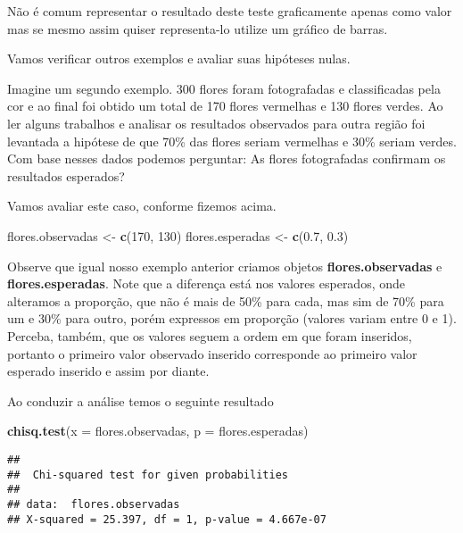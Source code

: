 \documentclass[14pt,titlepage, oneside, openany, a4paper]{book}
\newenvironment{Shaded}{\begin{snugshade}}{\end{snugshade}}
\newcommand{\DataTypeTok}[1]{\textcolor[rgb]{0.13,0.29,0.53}{#1}}
\newcommand{\DecValTok}[1]{\textcolor[rgb]{0.00,0.00,0.81}{#1}}
\newcommand{\FloatTok}[1]{\textcolor[rgb]{0.00,0.00,0.81}{#1}}
\newcommand{\KeywordTok}[1]{\textcolor[rgb]{0.13,0.29,0.53}{\textbf{#1}}}
\newcommand{\NormalTok}[1]{#1}
\newcommand{\StringTok}[1]{\textcolor[rgb]{0.31,0.60,0.02}{#1}}
\begin{document}
Não é comum representar o resultado deste teste graficamente apenas como valor mas se mesmo assim quiser representa-lo utilize um gráfico de barras.

Vamos verificar outros exemplos e avaliar suas hipóteses nulas.

Imagine um segundo exemplo. 300 flores foram fotografadas e classificadas pela cor e ao final foi obtido um total de 170 flores vermelhas e 130 flores verdes. Ao ler alguns trabalhos e analisar os resultados observados para outra região foi levantada a hipótese de que 70\% das flores seriam vermelhas e 30\% seriam verdes. Com base nesses dados podemos perguntar: As flores fotografadas confirmam os resultados esperados?

Vamos avaliar este caso, conforme fizemos acima.

\begin{Shaded}
\begin{Highlighting}[]
\NormalTok{flores.observadas <-}\StringTok{ }\KeywordTok{c}\NormalTok{(}\DecValTok{170}\NormalTok{, }\DecValTok{130}\NormalTok{)}
\NormalTok{flores.esperadas <-}\StringTok{ }\KeywordTok{c}\NormalTok{(}\FloatTok{0.7}\NormalTok{, }\FloatTok{0.3}\NormalTok{)}
\end{Highlighting}
\end{Shaded}

Observe que igual nosso exemplo anterior criamos objetos \textbf{flores.observadas} e \textbf{flores.esperadas}. Note que a diferença está nos valores esperados, onde alteramos a proporção, que não é mais de 50\% para cada, mas sim de 70\% para um e 30\% para outro, porém expressos em proporção (valores variam entre 0 e 1). Perceba, também, que os valores seguem a ordem em que foram inseridos, portanto o primeiro valor observado inserido corresponde ao primeiro valor esperado inserido e assim por diante.

Ao conduzir a análise temos o seguinte resultado

\begin{Shaded}
\begin{Highlighting}[]
\KeywordTok{chisq.test}\NormalTok{(}\DataTypeTok{x =}\NormalTok{ flores.observadas, }\DataTypeTok{p =}\NormalTok{ flores.esperadas)}
\end{Highlighting}
\end{Shaded}

\begin{verbatim}
## 
##  Chi-squared test for given probabilities
## 
## data:  flores.observadas
## X-squared = 25.397, df = 1, p-value = 4.667e-07
\end{verbatim}
\end{document}
